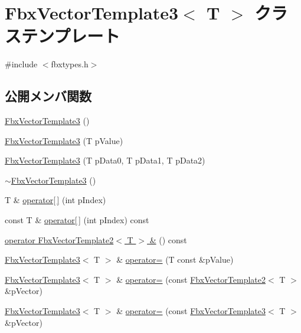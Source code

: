 \hypertarget{class_fbx_vector_template3}{}\section{Fbx\+Vector\+Template3$<$ T $>$ クラステンプレート}
\label{class_fbx_vector_template3}


{\ttfamily \#include $<$fbxtypes.\+h$>$}

\subsection*{公開メンバ関数}
\begin{DoxyCompactItemize}
\item 
\hyperlink{class_fbx_vector_template3_a3a0d3989e58b800da934f7810410ea9a}{Fbx\+Vector\+Template3} ()
\item 
\hyperlink{class_fbx_vector_template3_ad7d4fc47cec6104ad5e2dabc9d585588}{Fbx\+Vector\+Template3} (T p\+Value)
\item 
\hyperlink{class_fbx_vector_template3_a2d817cb1291287fb6da72e625f37b22f}{Fbx\+Vector\+Template3} (T p\+Data0, T p\+Data1, T p\+Data2)
\item 
\hyperlink{class_fbx_vector_template3_ad63aac28d1db0cc96220e0d5508b1910}{$\sim$\+Fbx\+Vector\+Template3} ()
\item 
T \& \hyperlink{class_fbx_vector_template3_a8bf2926bdd00fd0322f826a572eb516d}{operator\mbox{[}$\,$\mbox{]}} (int p\+Index)
\item 
const T \& \hyperlink{class_fbx_vector_template3_a54b2f30b8fd0d4b32bf6df936682d5f0}{operator\mbox{[}$\,$\mbox{]}} (int p\+Index) const
\item 
\hyperlink{class_fbx_vector_template3_ae3592b0f562df1272dc844f451cb0111}{operator Fbx\+Vector\+Template2$<$ T $>$ \&} () const
\item 
\hyperlink{class_fbx_vector_template3}{Fbx\+Vector\+Template3}$<$ T $>$ \& \hyperlink{class_fbx_vector_template3_aed9997cebee8c4bfeef05b433de743ec}{operator=} (T const \&p\+Value)
\item 
\hyperlink{class_fbx_vector_template3}{Fbx\+Vector\+Template3}$<$ T $>$ \& \hyperlink{class_fbx_vector_template3_a6776a6fce109a4e5eac1ef4efb56f070}{operator=} (const \hyperlink{class_fbx_vector_template2}{Fbx\+Vector\+Template2}$<$ T $>$ \&p\+Vector)
\item 
\hyperlink{class_fbx_vector_template3}{Fbx\+Vector\+Template3}$<$ T $>$ \& \hyperlink{class_fbx_vector_template3_a19181aa6e706a12de98b417624e67e4d}{operator=} (const \hyperlink{class_fbx_vector_template3}{Fbx\+Vector\+Template3}$<$ T $>$ \&p\+Vector)

\end{DoxyCompactItemize}

